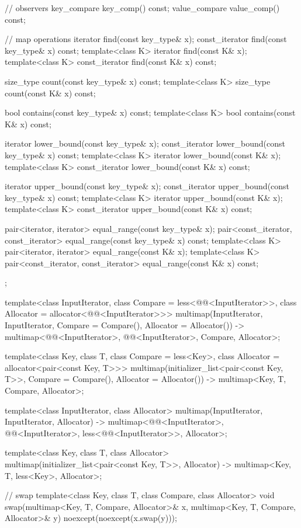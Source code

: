 \begin{codeblock}
{{    // observers
    key_compare key_comp() const;
    value_compare value_comp() const;

    // map operations
    iterator       find(const key_type& x);
    const_iterator find(const key_type& x) const;
    template<class K> iterator       find(const K& x);
    template<class K> const_iterator find(const K& x) const;

    size_type      count(const key_type& x) const;
    template<class K> size_type count(const K& x) const;

    bool           contains(const key_type& x) const;
    template<class K> bool contains(const K& x) const;

    iterator       lower_bound(const key_type& x);
    const_iterator lower_bound(const key_type& x) const;
    template<class K> iterator       lower_bound(const K& x);
    template<class K> const_iterator lower_bound(const K& x) const;

    iterator       upper_bound(const key_type& x);
    const_iterator upper_bound(const key_type& x) const;
    template<class K> iterator       upper_bound(const K& x);
    template<class K> const_iterator upper_bound(const K& x) const;

    pair<iterator, iterator>               equal_range(const key_type& x);
    pair<const_iterator, const_iterator>   equal_range(const key_type& x) const;
    template<class K>
      pair<iterator, iterator>             equal_range(const K& x);
    template<class K>
      pair<const_iterator, const_iterator> equal_range(const K& x) const;
  };

  template<class InputIterator, class Compare = less<@@<InputIterator>>,
           class Allocator = allocator<@@<InputIterator>>>
    multimap(InputIterator, InputIterator, Compare = Compare(), Allocator = Allocator())
      -> multimap<@@<InputIterator>, @@<InputIterator>,
                  Compare, Allocator>;

  template<class Key, class T, class Compare = less<Key>,
           class Allocator = allocator<pair<const Key, T>>>
    multimap(initializer_list<pair<const Key, T>>, Compare = Compare(), Allocator = Allocator())
      -> multimap<Key, T, Compare, Allocator>;

  template<class InputIterator, class Allocator>
    multimap(InputIterator, InputIterator, Allocator)
      -> multimap<@@<InputIterator>, @@<InputIterator>,
                  less<@@<InputIterator>>, Allocator>;

  template<class Key, class T, class Allocator>
    multimap(initializer_list<pair<const Key, T>>, Allocator)
      -> multimap<Key, T, less<Key>, Allocator>;

  // swap
  template<class Key, class T, class Compare, class Allocator>
    void swap(multimap<Key, T, Compare, Allocator>& x,
              multimap<Key, T, Compare, Allocator>& y)
      noexcept(noexcept(x.swap(y)));
}
\end{codeblock}%
